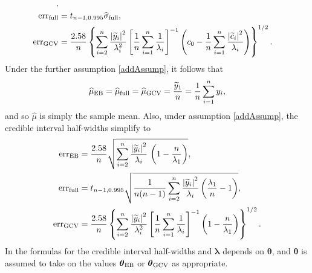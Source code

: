 \documentclass{svjour3}                     %
\newcommand{\bm}[1]{\boldsymbol{#1}}
\newcommand{\vlambda}{{\bm{\lambda}}}
\newcommand{\vtheta}{{\bm{\theta}}}
\newcommand{\hmu}{\widehat{\mu}}
\newcommand{\hsigma}{\widehat{\sigma}}
\newcommand{\MLE}{\textup{EB}}
\newcommand{\full}{\textup{full}}
\newcommand{\GCV}{\textup{GCV}}
\newcommand{\err}{\textup{err}}
\def\abs#1{\ensuremath{\left \lvert #1 \right \rvert}}
\begin{document}
\begin{theorem}
\begin{align}
{	}, \\
	\nonumber
	\err_{\full} & = t_{n-1,0.995} \hsigma_{\textup{full}}, \\
	\nonumber
	\err_{\textup{GCV}} & =
	\frac{2.58}{n}\left\{\sum_{i=2}^n \frac{\abs{\widetilde{y}_i}^2}{\lambda_i^2}  \left [ \frac 1n \sum_{i=1}^n \frac{1}{\lambda_i} \right]^{-1} 
	\left( c_0 - \frac 1n \sum_{i=1}^n \frac{\abs{\widetilde{c}_i}^2}{\lambda_i} \right) 
	\right\}^{1/2}.
	\end{align}
	Under the further assumption \eqref{addAssump}, it follows that 
	\begin{equation}
	\label{muhatGCV-FB-MLE-Simple}
	\hmu_\MLE  = \hmu_{\full} = \hmu_{\GCV} =
	\frac{\widetilde{y}_1}{n} = \frac 1n \sum_{i=1}^n y_i,
	\end{equation}
	and so $\hmu$ is simply the sample mean.  Also, under assumption \eqref{addAssump}, the credible interval half-widths simplify to
	\begin{subequations}
		\label{errSimple}
		\begin{align}
		\label{eq:errMLEAllAsump}
		\err_\MLE  &
		=
		\frac{2.58}{n}\sqrt{
			\sum_{i=2}^{n} \frac{\abs{\widetilde{y}_i}^2}{\lambda_i}  
			\,
			\left( 1 -  \frac{n}{\lambda_1} \right) 
		}, \\
		\label{FJH:eq:errFullSimple}
		\err_{\textup{full}}
		&=
		t_{n-1,0.995}
		\sqrt{\frac{1}{n(n-1)} \sum_{i=2}^n \frac{\abs{\widetilde{y}_i}^2}{\lambda_i}  \left(\frac{\lambda_1}{n}  - 1  \right)}, \\
		\label{errGCVSimple}
		\err_{\textup{GCV}} & =
		\frac{2.58}{n}\left\{\sum_{i=2}^n \frac{\abs{\widetilde{y}_i}^2}{\lambda_i^2}  \left [ \frac 1n \sum_{i=1}^n \frac{1}{\lambda_i} \right]^{-1} 
		\left( 1 -  \frac{n}{\lambda_1} \right)  
		\right\}^{1/2}. 
		\end{align}
	\end{subequations}
	In the formulas for the credible interval half-widths and $\vlambda$ depends on $\vtheta$, and  $\vtheta$ is assumed to take on the values $\vtheta_{\MLE}$ or $\vtheta_{\GCV}$ as appropriate.
\end{theorem}
\end{document}
